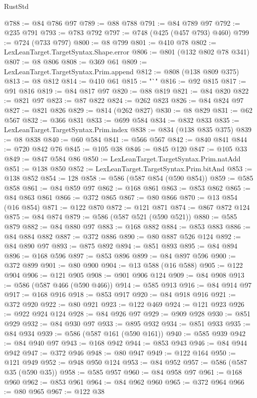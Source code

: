 \begin{lexlean}{RustStd}
\begin{coremodule}
{\begin{coremodule}
{{{{{{{{{{{{{{{{{{{{{{{{{{{{{{{{{{{{{{{{{{{{{{{{{{{{{{@788 := @84 @786 @97
@789 := @88 @788
@791 := @84 @789 @97
@792 := @235 @791
@793 := @783 @792
@797 := @748 (@425 (@457 @793) @460)
@799 := @724 (@733 @797)
@800 := @8 @799
@801 := @410 @78
@802 := LexLeanTarget.TargetSyntax.Shape.error
@806 := @801 (@132 @802 @78 @341)
@807 := @8 @806
@808 := @369 @61
@809 := LexLeanTarget.TargetSyntax.Prim.append
@812 := @808 (@138 @809 @375)
@813 := @8 @812
@814 := @410 @61
@815 := "`"
@816 := @92 @815
@817 := @91 @816
@819 := @84 @817 @97
@820 := @88 @819
@821 := @84 @820
@822 := @821 @97
@823 := @87 @822
@824 := @262 @823
@826 := @84 @824 @97
@827 := @821 @826
@829 := @814 (@262 @827)
@830 := @8 @829
@831 := @62 @567
@832 := @366 @831
@833 := @699 @584
@834 := @832 @833
@835 := LexLeanTarget.TargetSyntax.Prim.index
@838 := @834 (@138 @835 @375)
@839 := @8 @838
@840 := @60 @584
@841 := @566 @567
@842 := @840 @841
@844 := @720 @842 @76
@845 := @105 @38
@846 := @845 @120
@847 := @105 @33
@849 := @847 @584 @86
@850 := LexLeanTarget.TargetSyntax.Prim.natAdd
@851 := @138 @850
@852 := LexLeanTarget.TargetSyntax.Prim.bitAnd
@853 := @138 @852
@854 := 128
@858 := @586 (@587 @854 (@590 @854))
@859 := @585 @858
@861 := @84 @859 @97
@862 := @168 @861
@863 := @853 @862
@865 := @84 @863 @861
@866 := @372 @865
@867 := @80 @866
@870 := @13 @854 (@16 @854)
@871 := @122 @870
@872 := @121 @871
@874 := @867 @872 @124
@875 := @84 @874
@879 := @586 (@587 @521 (@590 @521))
@880 := @585 @879
@882 := @84 @880 @97
@883 := @168 @882
@884 := @853 @883
@886 := @84 @884 @882
@887 := @372 @886
@890 := @80 @887 @526 @124
@892 := @84 @890 @97
@893 := @875 @892
@894 := @851 @893
@895 := @84 @894
@896 := @168 @596
@897 := @853 @896
@899 := @84 @897 @596
@900 := @372 @899
@901 := @80 @900
@904 := @13 @588 (@16 @588)
@905 := @122 @904
@906 := @121 @905
@908 := @901 @906 @124
@909 := @84 @908
@913 := @586 (@587 @466 (@590 @466))
@914 := @585 @913
@916 := @84 @914 @97
@917 := @168 @916
@918 := @853 @917
@920 := @84 @918 @916
@921 := @372 @920
@922 := @80 @921
@923 := @122 @469
@924 := @121 @923
@926 := @922 @924 @124
@928 := @84 @926 @97
@929 := @909 @928
@930 := @851 @929
@932 := @84 @930 @97
@933 := @895 @932
@934 := @851 @933
@935 := @84 @934
@939 := @586 (@587 @161 (@590 @161))
@940 := @585 @939
@942 := @84 @940 @97
@943 := @168 @942
@944 := @853 @943
@946 := @84 @944 @942
@947 := @372 @946
@948 := @80 @947
@949 := @122 @164
@950 := @121 @949
@952 := @948 @950 @124
@953 := @84 @952
@957 := @586 (@587 @35 (@590 @35))
@958 := @585 @957
@960 := @84 @958 @97
@961 := @168 @960
@962 := @853 @961
@964 := @84 @962 @960
@965 := @372 @964
@966 := @80 @965
@967 := @122 @38
}}}}}}}}}}}}}}}}}}}}}}}}}}}}}}}}}}}}}}}}}}}}}}}}}}}}}}
\end{coremodule}}
\end{coremodule}
\end{lexlean}
